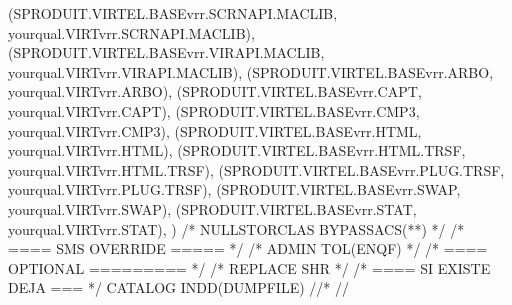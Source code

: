 \documentclass[letterpaper,10pt,english]{sphinxmanual}
\begin{document}
\begin{sphinxVerbatim}[commandchars=\\\{\}]
    (SPRODUIT.VIRTEL.BASEvrr.SCRNAPI.MACLIB, \PYGZhy{}
            yourqual.VIRTvrr.SCRNAPI.MACLIB), \PYGZhy{}
    (SPRODUIT.VIRTEL.BASEvrr.VIRAPI.MACLIB, \PYGZhy{}
            yourqual.VIRTvrr.VIRAPI.MACLIB), \PYGZhy{}
    (SPRODUIT.VIRTEL.BASEvrr.ARBO, \PYGZhy{}
            yourqual.VIRTvrr.ARBO), \PYGZhy{}
    (SPRODUIT.VIRTEL.BASEvrr.CAPT, \PYGZhy{}
            yourqual.VIRTvrr.CAPT), \PYGZhy{}
    (SPRODUIT.VIRTEL.BASEvrr.CMP3, \PYGZhy{}
            yourqual.VIRTvrr.CMP3), \PYGZhy{}
    (SPRODUIT.VIRTEL.BASEvrr.HTML, \PYGZhy{}
            yourqual.VIRTvrr.HTML), \PYGZhy{}
    (SPRODUIT.VIRTEL.BASEvrr.HTML.TRSF, \PYGZhy{}
            yourqual.VIRTvrr.HTML.TRSF), \PYGZhy{}
    (SPRODUIT.VIRTEL.BASEvrr.PLUG.TRSF, \PYGZhy{}
            yourqual.VIRTvrr.PLUG.TRSF), \PYGZhy{}
            (SPRODUIT.VIRTEL.BASEvrr.SWAP, \PYGZhy{}
                    yourqual.VIRTvrr.SWAP), \PYGZhy{}
            (SPRODUIT.VIRTEL.BASEvrr.STAT, \PYGZhy{}
                    yourqual.VIRTvrr.STAT), \PYGZhy{}
                    ) \textendash{}
    /* NULLSTORCLAS BYPASSACS(**) */ /* \PYGZlt{}==== SMS OVERRIDE ===== */ \PYGZhy{}
    /* ADMIN TOL(ENQF) */                    /* \PYGZlt{}==== OPTIONAL ========= */ \PYGZhy{}
    /* REPLACE SHR */                                /* \PYGZlt{}==== SI EXISTE DEJA === */ \PYGZhy{}
            CATALOG INDD(DUMPFILE)
    //*
    //
\end{sphinxVerbatim}

\sphinxAtStartPar
{}
\end{document}
